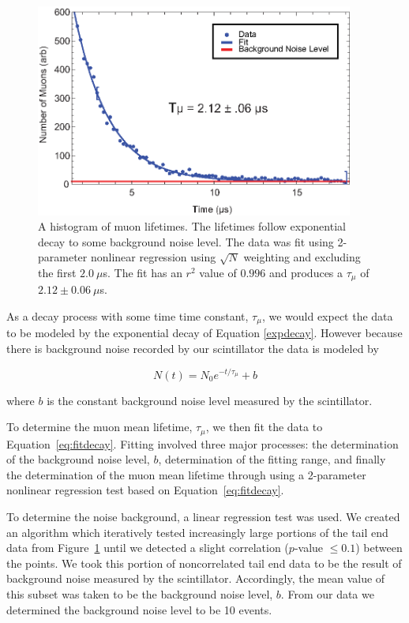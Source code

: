 \begin{figure}[htbp]
\begin{center}
\includegraphics[height=70mm]{./figures/muon_decay.eps}
\caption{A histogram of muon lifetimes. The lifetimes follow exponential decay to some background noise level.  The data was fit using 2-parameter nonlinear regression using $\sqrt{N}$ weighting and excluding the first $2.0~\mu$s.  The fit has an $r^{2}$ value of $0.996$ and produces a $\tau_{\mu}$ of $2.12 \pm 0.06~\mu$s.}
\label{fig:muondecay}
\end{center}
\end{figure}

 As a decay process with some time time constant, $\tau_{\mu}$, we
would expect the data to be modeled by the exponential decay of Equation \eqref{expdecay}.  However because there is background noise recorded by our
scintillator the data is modeled by

\begin{equation}
\label{eq:fitdecay}
N(t) = N_{0} e^{-t/\tau_{\mu}}+b
\end{equation}

where $b$ is the constant background noise level measured by the scintillator. 

To determine the muon mean lifetime, $\tau_{\mu}$, we then fit the
data to Equation~\eqref{eq:fitdecay}.  Fitting involved three major processes: the
determination of the background noise level, $b$, determination of the
fitting range, and finally the determination of the muon mean lifetime
through using a 2-parameter nonlinear regression test based on Equation~\eqref{eq:fitdecay}.

To determine the noise background, a linear regression test was used.
We created an algorithm which iteratively tested increasingly large
portions of the tail end data from Figure~\ref{fig:muondecay} until we detected a
slight correlation ($p$-value $\leq 0.1$) between the points.  We took
this portion of noncorrelated tail end data to be the result of
background noise measured by the scintillator.  Accordingly, the mean
value of this subset was taken to be the background noise level,
$b$. From our data we determined the background noise level to be 10
events.

